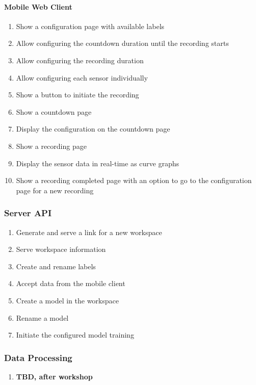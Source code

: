\paragraph{Mobile Web Client}
\begin{enumerate}[resume*]
    \item Show a configuration page with available labels
    \item Allow configuring the countdown duration until the recording starts
    \item Allow configuring the recording duration
    \item Allow configuring each sensor individually
    \item Show a button to initiate the recording
    \item Show a countdown page
    \item Display the configuration on the countdown page
    \item Show a recording page
    \item Display the sensor data in real-time as curve graphs
    \item Show a recording completed page with an option to go to the configuration page for a new recording%
\end{enumerate}

\subsubsection{Server API}
\begin{enumerate}[resume*]
    \item Generate and serve a link for a new workspace
    \item Serve workspace information
    \item Create and rename labels
    \item Accept data from the mobile client
    \item Create a model in the workspace
    \item Rename a model
    \item Initiate the configured model training
\end{enumerate}

\subsubsection{Data Processing}
\begin{enumerate}[resume*]
    \item \textbf{TBD, after workshop}
\end{enumerate}

